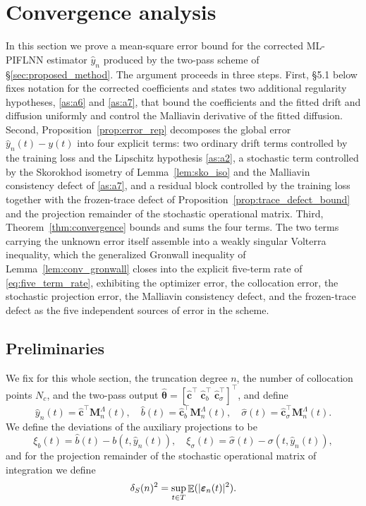 \documentclass[11pt, a4paper]{article}
\theoremstyle{theoremstyle}
\theoremstyle{definitionstyle}
\DeclareMathOperator{\EE}{\mathbb E}
\DeclarePairedDelimiter{\abs}{\lvert}{\rvert}
\begin{document}
\section{Convergence analysis}\label{sec:convergence}
In this section we prove a mean-square error bound for the corrected ML-PIFLNN estimator $\hat y_n$ produced by the two-pass scheme of \S\ref{sec:proposed_method}. The argument proceeds in three steps. First, \S5.1 below fixes notation for the corrected coefficients and states two additional regularity hypotheses, \ref{as:a6} and \ref{as:a7}, that bound the coefficients and the fitted drift and diffusion uniformly and control the Malliavin derivative of the fitted diffusion. Second, Proposition~\ref{prop:error_rep} decomposes the global error $\hat y_n(t) - y(t)$ into four explicit terms: two ordinary drift terms controlled by the training loss and the Lipschitz hypothesis \ref{as:a2}, a stochastic term controlled by the Skorokhod isometry of Lemma~\ref{lem:sko_iso} and the Malliavin consistency defect of \ref{as:a7}, and a residual block controlled by the training loss together with the frozen-trace defect of Proposition~\ref{prop:trace_defect_bound} and the projection remainder of the stochastic operational matrix. Third, Theorem~\ref{thm:convergence} bounds and sums the four terms. The two terms carrying the unknown error itself assemble into a weakly singular Volterra inequality, which the generalized Gronwall inequality of Lemma~\ref{lem:conv_gronwall} closes into the explicit five-term rate of \eqref{eq:five_term_rate}, exhibiting the optimizer error, the collocation error, the stochastic projection error, the Malliavin consistency defect, and the frozen-trace defect as the five independent sources of error in the scheme.

\subsection{Preliminaries}
We fix for this whole section, the truncation degree $n$, the number of collocation points $N_c$, and the two-pass output $\hat{\boldsymbol \theta} = [\hat{\mathbf c}^\top \; \hat{\mathbf c}_b^\top \; \hat{\mathbf c}_\sigma^\top]^\top$, and define
\begin{equation}
    \hat{y}_n(t) = \hat{\mathbf c}^\top \mathbf M_n^\Lambda(t), \quad \hat b (t) = \hat{\mathbf c}_b^\top \mathbf M_n^\Lambda(t), \quad \hat \sigma (t) = \hat{\mathbf c}_\sigma^\top \mathbf M_n^\Lambda(t).
\end{equation}
We define the deviations of the auxiliary projections to be
\begin{equation}\label{eq:xi_deviations}
    \xi_b(t) = \hat b(t) - b(t, \hat y_n(t)), \quad \xi_\sigma(t) = \hat \sigma(t) - \sigma(t, \hat y_n(t)),
\end{equation}
and for the projection remainder of the stochastic operational matrix of integration we define
\begin{equation}\label{eq:deltaS}
    \delta_S(n)^2 = \sup_{t \in T} \EE (\abs{\boldsymbol \varepsilon_n(t)}^2).
\end{equation}
\end{document}
